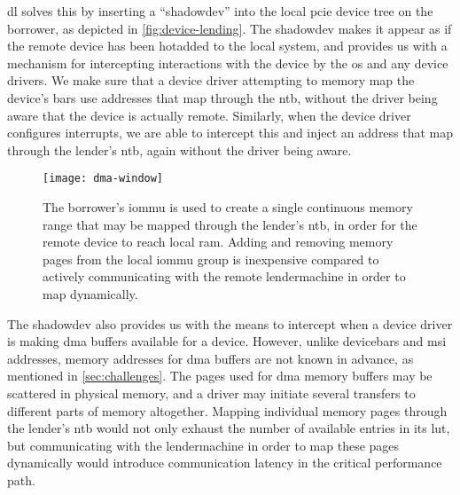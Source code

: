 \Gls{dl} solves this by inserting a ``\gls{shadowdev}'' into the local \gls{pcie} device tree on the \gls{borrower}, as depicted in \cref{fig:device-lending}. 
%
The \gls{shadowdev} makes it appear as if the remote device has been \gls{hotadded} to the local system, and provides us with a mechanism for intercepting interactions with the device by the \gls{os} and any device drivers. 
%
We make sure that a device driver attempting to memory map the device's \glspl{bar} use addresses that map through the \gls{ntb}, without the driver being aware that the device is actually remote.
%
Similarly, when the device driver configures interrupts, we are able to intercept this and inject an address that map through the \gls{lender}'s \gls{ntb}, again without the driver being aware.



\begin{figure}
    \centering
    \texttt{[image: dma-window]}
    \caption[The borrower's  is used to create a single continuous memory range that may be mapped through the lender's . Adding and removing memory pages from the local  group is inexpensive compared to actively communicating with the remote lender~machine in order to map dynamically]
    {The \gls{borrower}'s \gls{iommu} is used to create a single continuous memory range that may be mapped through the \gls{lender}'s \gls{ntb}, in order for the remote device to reach local \gls{ram}. Adding and removing memory pages from the local \gls{iommu} group is inexpensive compared to actively communicating with the remote \gls{lendermachine} in order to map dynamically.}
    \label{fig:dma-window}
\end{figure}


The \gls{shadowdev} also provides us with the means to intercept when a device driver is making \gls{dma} buffers available for a device.
%
However, unlike \glspl{devicebar} and \gls{msi} addresses, memory addresses for \gls{dma} buffers are not known in advance, as mentioned in \cref{sec:challenges}.
%
The pages used for \gls{dma} memory buffers may be scattered in physical memory, and a driver may initiate several transfers to different parts of memory altogether.
%
Mapping individual memory pages through the \gls{lender}'s \gls{ntb} would not only exhaust the number of available entries in its \gls{lut}, but communicating with the \gls{lendermachine} in order to map these pages dynamically would introduce communication latency in the critical performance path.



